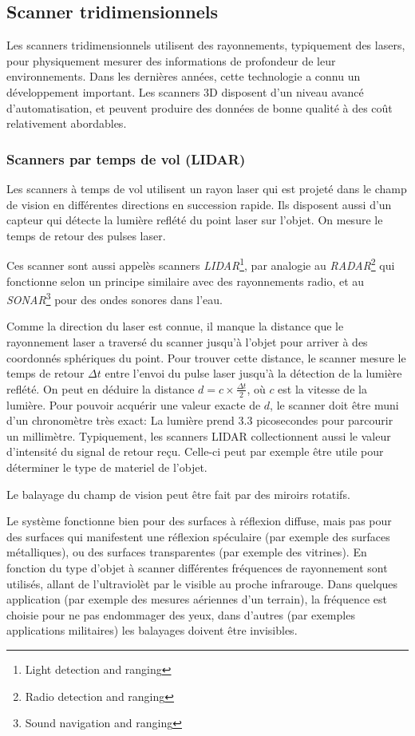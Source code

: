 \documentclass[a4paper,10pt]{scrreprt}
\begin{document}
\subsection{Scanner tridimensionnels}
Les scanners tridimensionnels utilisent des rayonnements, typiquement des lasers, pour physiquement mesurer des informations de profondeur de leur environnements. Dans les dernières années, cette technologie a connu un développement important. Les scanners 3D disposent d'un niveau avancé d'automatisation, et peuvent produire des données de bonne qualité \cite{Grus2012} à des coût relativement abordables.

\subsubsection{Scanners par temps de vol (LIDAR)}
Les scanners à temps de vol utilisent un rayon laser qui est projeté dans le champ de vision en différentes directions en succession rapide. Ils disposent aussi d'un capteur qui détecte la lumière reflété du point laser sur l'objet. On mesure le temps de retour des pulses laser. 

Ces scanner sont aussi appelès scanners \emph{LIDAR}\footnote{Light detection and ranging}, par analogie au \emph{RADAR}\footnote{Radio detection and ranging} qui fonctionne selon un principe similaire avec des rayonnements radio, et au \emph{SONAR}\footnote{Sound navigation and ranging} pour des ondes sonores dans l'eau.

Comme la direction du laser est connue, il manque la distance que le rayonnement laser a traversé du scanner jusqu'à l'objet pour arriver à des coordonnés sphériques du point. Pour trouver cette distance, le scanner mesure le temps de retour $\Delta t$ entre l'envoi du pulse laser jusqu'à la détection de la lumière reflété. On peut en déduire la distance $d = c \times \frac{\Delta t}{2}$, où $c$ est la vitesse de la lumière. Pour pouvoir acquérir une valeur exacte de $d$, le scanner doit être muni d'un chronomètre très exact: La lumière prend $3.3$ picosecondes pour parcourir un millimètre. Typiquement, les scanners LIDAR collectionnent aussi le valeur d'intensité du signal de retour reçu. Celle-ci peut par exemple être utile pour déterminer le type de materiel de l'objet.

Le balayage du champ de vision peut être fait par des miroirs rotatifs. 

Le système fonctionne bien pour des surfaces à réflexion diffuse, mais pas pour des surfaces qui manifestent une réflexion spéculaire (par exemple des surfaces métalliques), ou des surfaces transparentes (par exemple des vitrines). En fonction du type d'objet à scanner différentes fréquences de rayonnement sont utilisés, allant de l'ultraviolèt par le visible au proche infrarouge. Dans quelques application (par exemple des mesures aériennes d'un terrain), la fréquence est choisie pour ne pas endommager des yeux, dans d'autres (par exemples applications militaires) les balayages doivent être invisibles.
\end{document}
